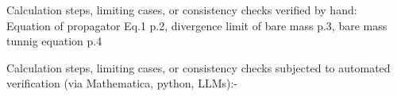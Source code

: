 \documentclass[11pt]{article}
\begin{document}
	Calculation steps, limiting cases, or consistency checks verified by hand:\\ 
	Equation of propagator Eq.1 p.2, divergence limit of bare mass p.3, bare mass tunnig equation p.4
	
	Calculation steps, limiting cases, or consistency checks subjected to automated verification (via Mathematica, python, LLMs):-
	
\end{document}
